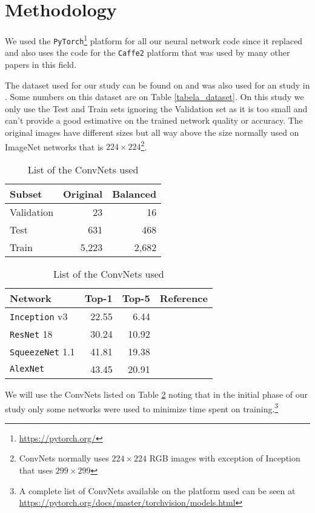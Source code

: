 \documentclass[twocolumn]{article}
\newcommand{\mycite}{\cite}
\begin{document}
\section{Methodology}
We used the \texttt{PyTorch}\footnote{\url{https://pytorch.org/}} platform for all our neural network code since it replaced and also uses the code for the \texttt{Caffe2} platform that was used by many other papers in this field.

The dataset used for our study can be found on \mycite{Dataset} and was also used for an study in \mycite{Kermany2018}. Some numbers on this dataset are on Table \ref{tabela_dataset}. On this study we only use the Test and Train sets ignoring the Validation set as it is too small and can't provide a good estimative on the trained network quality or accuracy. The original images have different sizes but all way above the size normally used on ImageNet networks that is $224 \times 224$\footnote{ConvNets normally uses $224 \times 224$ RGB images with exception of Inception that uses $299 \times 299$}.

\begin{table}[ht]
\centering
\begin{tabular}{lrr}
Subset & Original & Balanced\\
\midrule
Validation & 23 & 16\\
Test & 631 & 468 \\
Train & 5,223 & 2,682 \\
\end{tabular}
\caption{Number of chest x-rays images in the dataset from \mycite{Dataset}}
\label{tabela_dataset}
\centering
\begin{tabular}{lrrr}
Network & Top-1 & Top-5 & Reference\\
\toprule
\texttt{Inception} v3 & 22.55 & 6.44 & \mycite{inception}\\
\texttt{ResNet} 18 & 30.24 & 10.92 & \mycite{resnet}\\
\texttt{SqueezeNet} 1.1 & 41.81 & 19.38 & \mycite{squeezenet}\\
\texttt{AlexNet} & 43.45 & 20.91 & \mycite{ImageNet}\\
\end{tabular}
\caption{List of the ConvNets used}
\label{tabela_convnets}
\end{table}

We will use the ConvNets listed on Table \ref{tabela_convnets} noting that in the initial phase of our study only some networks were used to minimize time spent on training.\footnote{A complete list of ConvNets available on the platform used can be seen at \url{https://pytorch.org/docs/master/torchvision/models.html}}
\end{document}
